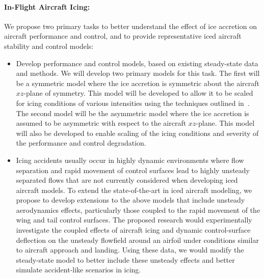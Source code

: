 \documentclass[letter,onecolumn,12pt]{aiaa-tc}
\begin{document}
\paragraph{In-Flight Aircraft Icing:} We propose two primary tasks to better understand the effect of ice accretion on aircraft performance and control, and to provide representative iced aircraft stability and control models:
\begin{itemize}
\setlength{\itemsep}{-2pt}
\vspace{-2mm}

\item Develop performance and control models, based on existing steady-state data and methods. We will develop two primary models for this task. The first will be a symmetric model where the ice accretion is symmetric about the aircraft $\mathit{xz}$-plane of symmetry.  This model will be developed to allow it to be scaled for icing conditions of various intensities using the techniques outlined in~\cite{ICING_Bragg02}. The second model will be the asymmetric model where the ice accretion is assumed to be asymmetric with respect to the aircraft $\mathit{xz}$-plane. This model will also be developed to enable scaling of the icing conditions and severity of the performance and control degradation. %


\item Icing accidents usually occur in highly dynamic environments where flow separation and rapid movement of control surfaces lead to highly unsteady separated flows that are not currently considered when developing iced aircraft models. To extend the state-of-the-art in iced aircraft modeling, we propose to develop extensions to the above models that include unsteady aerodynamics effects, particularly those coupled to the rapid movement of the wing and tail control surfaces. The proposed research would experimentally investigate the coupled effects of aircraft icing and dynamic control-surface deflection on the unsteady flowfield around an airfoil under conditions similar to aircraft approach and landing. Using these data, we would modify the steady-state model to better include these unsteady effects and better simulate accident-like scenarios in icing.

\end{itemize}
\end{document}
